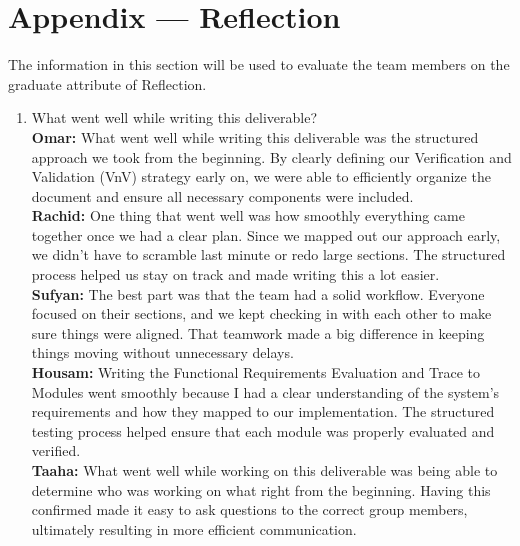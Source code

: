 \documentclass[12pt, titlepage]{article}
\begin{document}
\newpage{}
\section*{Appendix --- Reflection}

The information in this section will be used to evaluate the team members on the
graduate attribute of Reflection.



\begin{enumerate}
  \item What went well while writing this deliverable? \\
  \textbf{Omar:} What went well while writing this deliverable was the structured approach we took from the beginning. By clearly defining our Verification and Validation (VnV) strategy early on, we were able to efficiently organize the document and ensure all necessary components were included. \\
  \textbf{Rachid:} One thing that went well was how smoothly everything came together once we had a clear plan. Since we mapped out our approach early, we didn't have to scramble last minute or redo large sections. The structured process helped us stay on track and made writing this a lot easier. \\
  \textbf{Sufyan:} The best part was that the team had a solid workflow. Everyone focused on their sections, and we kept checking in with each other to make sure things were aligned. That teamwork made a big difference in keeping things moving without unnecessary delays. \\
  \textbf{Housam:} Writing the Functional Requirements Evaluation and Trace to Modules went smoothly because I had a clear understanding of the system’s requirements and how they mapped to our implementation. The structured testing process helped ensure that each module was properly evaluated and verified.\\
  \textbf{Taaha:} What went well while working on this deliverable was being able to determine who was working on what right from the beginning. Having this confirmed made it easy to ask questions to the correct group members, ultimately resulting in more efficient communication.
  


\end{enumerate}
\end{document}
